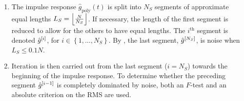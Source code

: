 
\begin{enumerate}
  \item The impulse response $\hat{g}_\mathrm{poly}(t)$ is split into $N_S$ segments of approximate equal lengths
$L_S = \left\lfloor \frac{N}{N_S} \right\rfloor$. 
If necessary, the length of the first segment is reduced to allow for the others to have equal lengths.
The $i^{\text{th}}$ segment is denoted ${\hat{g}}^{[i]}$, for $i \in \left\{1,\ldots,N_S\right\}$.
  By , the last segment, ${\hat{g}}^{[N_S]}$, is noise when $L_S \leqslant 0.1N$.
  
  \item Iteration is then carried out from the last segment ($i = N_S$) towards the beginning of the impulse response. To determine whether the preceding segment ${\hat{g}}^{[i-1]}$ is completely dominated by noise,  both an $F$-test and an absolute criterion on the RMS are used.


\end{enumerate}
